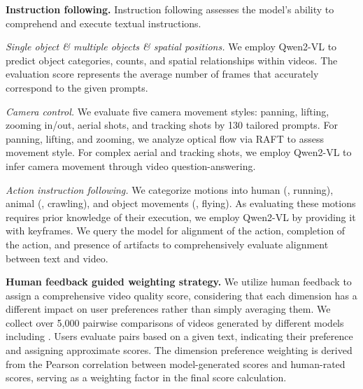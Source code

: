 \textbf{Instruction following.} Instruction following assesses the model's ability to comprehend and execute textual instructions.


\textit{Single object \& multiple objects \& spatial positions.} 
We employ Qwen2-VL to predict object categories, counts, and spatial relationships within videos. 
The evaluation score represents the average number of frames that accurately correspond to the given prompts.



\textit{Camera control.}
We evaluate five camera movement styles: panning, lifting, zooming in/out, aerial shots, and tracking shots by 130 tailored prompts. For panning, lifting, and zooming, we analyze optical flow via RAFT to assess movement style. 
For complex aerial and tracking shots, we employ Qwen2-VL to infer camera movement through video question-answering.

\textit{Action instruction following.} We categorize motions into human (\eg, running), animal (\eg, crawling), and object movements (\eg, flying). 
As evaluating these motions requires prior knowledge of their execution, we employ Qwen2-VL by providing it with keyframes. 
We query the model for alignment of the action, completion of the action, and presence of artifacts to comprehensively evaluate alignment between text and video.

\textbf{Human feedback guided weighting strategy.}\label{hf-align} We utilize human feedback to assign a comprehensive video quality score, considering that each dimension has a different impact on user preferences rather than simply averaging them.
We collect over 5,000 pairwise comparisons of videos generated by different models including \method. Users evaluate pairs based on a given text, indicating their preference and assigning approximate scores. 
The dimension preference weighting is derived from the Pearson correlation between model-generated scores and human-rated scores, serving as a weighting factor in the final score calculation. 